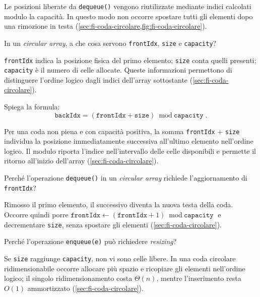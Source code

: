 Le posizioni liberate da \texttt{dequeue()} vengono riutilizzate mediante indici
calcolati modulo la capacità. In questo modo non occorre spostare tutti gli
elementi dopo una rimozione in testa
(\cref{sec:fi-coda-circolare,fig:fi-coda-circolare}).

\begin{exercise}
\label{ex:fi-esercizi-strutture-dati-queue-front-size-capacity}
In un \emph{circular array}, a che cosa servono \texttt{frontIdx}, \texttt{size}
e \texttt{capacity}?
\end{exercise}

\texttt{frontIdx} indica la posizione fisica del primo elemento; \texttt{size}
conta quelli presenti; \texttt{capacity} è il numero di celle allocate. Queste
informazioni permettono di distinguere l'ordine logico dagli indici dell'array
sottostante (\cref{sec:fi-coda-circolare}).

\begin{exercise}
\label{ex:fi-esercizi-strutture-dati-queue-back-formula}
Spiega la formula:
\[
  \texttt{backIdx}=(\texttt{frontIdx}+\texttt{size})\bmod\texttt{capacity}.
\]
\end{exercise}

Per una coda non piena e con capacità positiva, la somma \texttt{frontIdx} +
\texttt{size} individua la posizione immediatamente successiva all'ultimo
elemento nell'ordine logico. Il modulo riporta l'indice nell'intervallo delle
celle disponibili e permette il ritorno all'inizio dell'array
(\cref{sec:fi-coda-circolare}).

\begin{exercise}
\label{ex:fi-esercizi-strutture-dati-queue-dequeue-front}
Perché l'operazione \texttt{dequeue()} in un \emph{circular array} richiede
l'aggiornamento di \texttt{frontIdx}?
\end{exercise}

Rimosso il primo elemento, il successivo diventa la nuova testa della coda.
Occorre quindi porre
\(\texttt{frontIdx}\gets(\texttt{frontIdx}+1)\bmod\texttt{capacity}\) e
decrementare \texttt{size}, senza spostare gli elementi
(\cref{sec:fi-coda-circolare}).

\begin{exercise}
\label{ex:fi-esercizi-strutture-dati-queue-enqueue-resize}
Perché l'operazione \texttt{enqueue(e)} può richiedere \emph{resizing}?
\end{exercise}

Se \texttt{size} raggiunge \texttt{capacity}, non vi sono celle libere. In una
coda circolare ridimensionabile occorre allocare più spazio e ricopiare gli
elementi nell'ordine logico; il singolo ridimensionamento costa \(\Theta(n)\),
mentre l'inserimento resta \(O(1)\) ammortizzato (\cref{sec:fi-coda-circolare}).

